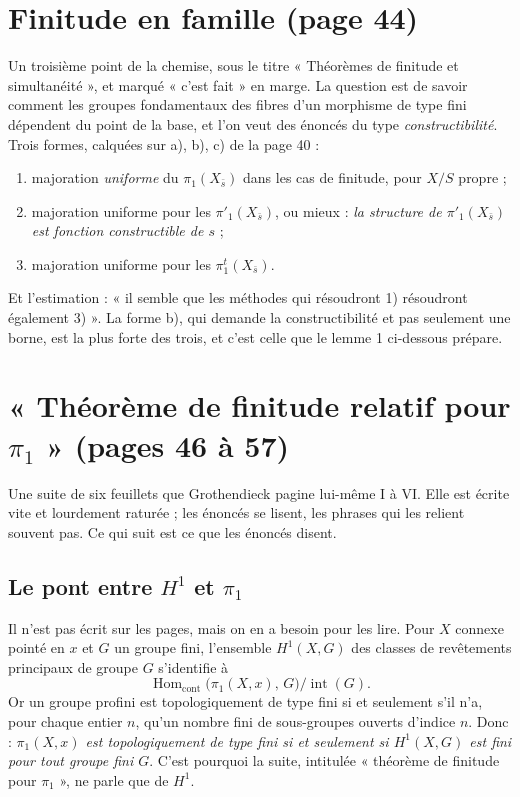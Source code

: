 \documentclass[11pt,a4paper]{article}
\begin{document}
\section*{Finitude en famille (page 44)}

Un troisième point de la chemise, sous le titre « Théorèmes de finitude et
simultanéité », et marqué « c'est fait » en marge. La question est de savoir
comment les groupes fondamentaux des fibres d'un morphisme de type fini
dépendent du point de la base, et l'on veut des énoncés du type
\emph{constructibilité}. Trois formes, calquées sur a), b), c) de la page 40 :

\begin{enumerate}
  \item[a)] majoration \emph{uniforme} du $\pi_{1}(X_{\bar{s}})$ dans les cas
    de finitude, pour $X/S$ propre ;
  \item[b)] majoration uniforme pour les $\pi'_{1}(X_{\bar{s}})$, ou mieux :
    \emph{la structure de $\pi'_{1}(X_{\bar{s}})$ est fonction constructible de
    $s$} ;
  \item[c)] majoration uniforme pour les $\pi^{t}_{1}(X_{\bar{s}})$.
\end{enumerate}

Et l'estimation : « il semble que les méthodes qui résoudront 1) résoudront
également 3) ». La forme b), qui demande la constructibilité et pas seulement
une borne, est la plus forte des trois, et c'est celle que le lemme 1 ci-dessous
prépare.

\section*{« Théorème de finitude relatif pour $\pi_{1}$ » (pages 46 à 57)}

Une suite de six feuillets que Grothendieck pagine lui-même I à VI. Elle est
écrite vite et lourdement raturée ; les énoncés se lisent, les phrases qui les
relient souvent pas. Ce qui suit est ce que les énoncés disent.

\subsection*{Le pont entre $H^{1}$ et $\pi_{1}$}

Il n'est pas écrit sur les pages, mais on en a besoin pour les lire. Pour
$X$ connexe pointé en $x$ et $G$ un groupe fini, l'ensemble $H^{1}(X,G)$ des
classes de revêtements principaux de groupe $G$ s'identifie à
\[
  \operatorname{Hom}_{\mathrm{cont}}\bigl(\pi_{1}(X,x),\, G\bigr) \big/
  \operatorname{int}(G) .
\]
Or un groupe profini est topologiquement de type fini si et seulement s'il n'a,
pour chaque entier $n$, qu'un nombre fini de sous-groupes ouverts d'indice $n$.
Donc : \emph{$\pi_{1}(X,x)$ est topologiquement de type fini si et seulement si
$H^{1}(X,G)$ est fini pour tout groupe fini $G$}. C'est pourquoi la suite,
intitulée « théorème de finitude pour $\pi_{1}$ », ne parle que de $H^{1}$.
\end{document}
